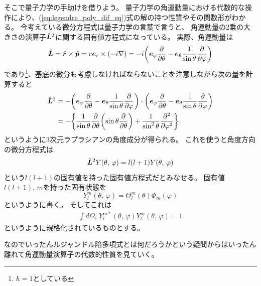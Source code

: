 \documentclass[../master.tex]{subfiles}
\begin{document}
そこで量子力学の手助けを借りよう。
量子力学の角運動量における代数的な操作により、(\ref{eq:legendre_poly_dif_eq})式の解の持つ性質やその関数形がわかる。
今考えている微分方程式は量子力学の言葉で言うと、
角運動量の2乗の大きさの演算子\(\hat{\vb*{L}}^2\)に関する固有値方程式になっている。
実際、角運動量は
\begin{align}
	\hat{\vb*{L}}  = \hat{\vb*{r}} \times \hat{\vb*{p}}
	               = r\vb*{e}_r \times \qty(-i\nabla)
	               =-i\qty(\vb*{e}_{\varphi}\pdv{\theta}-\vb*{e}_{\theta}\frac{1}{\sin\theta}\pdv{\varphi})
\end{align}
であり\footnote{\(\hbar=1\)としている}、基底の微分も考慮しなければならないことを注意しながら次の量を計算すると
\begin{equation}\begin{aligned}[b]
    \hat{\vb*{L}}^2 & = -\qty(\vb*{e}_{\varphi}\pdv{\theta}-\vb*{e}_{\theta}\frac{1}{\sin\theta}\pdv{\varphi})\cdot\qty(\vb*{e}_{\varphi}\pdv{\theta}-\vb*{e}_{\theta}\frac{1}{\sin\theta}\pdv{\varphi}) \\
	                & = -\qty{\frac{1}{\sin\theta}\pdv{\theta}\qty(\sin\theta\pdv{\theta})+\frac{1}{\sin^2\theta}\pdv[2]{\varphi}}
\end{aligned}\end{equation}
というように3次元ラプラシアンの角度成分が得られる。
これを使うと角度方向の微分方程式は
\begin{equation}
	\hat{\vb*{L}}^2 Y(\theta,\,\varphi) = l(l+1) Y(\theta,\,\varphi)
\end{equation}
という\(l(l+1)\)の固有値を持った固有値方程式だとみなせる。
固有値\(l(l+1),\,m\)を持った固有状態を
\begin{equation}
	Y_l^m(\theta,\,\varphi) = \Theta_l^m(\theta)\Phi_m(\varphi)
\end{equation}
というように書く。
そしてこれは
\begin{align}
	\int d\Omega ,\, Y_{l}^{m*}(\theta,\,\varphi)Y_{l}^m(\theta,\,\varphi) = 1
\end{align}
というように規格化されているものとする。

なのでいったんルジャンドル陪多項式とは何だろうかという疑問からはいったん離れて角運動量演算子の代数的性質を見ていく。
\end{document}
